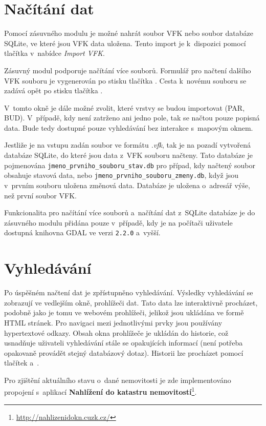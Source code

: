 \documentclass[a4paper,12pt,oneside]{book}
\begin{document}
\section{Načítání dat}
Pomocí zásuvného modulu je možné nahrát soubor VFK nebo soubor
databáze SQLite, ve které jsou VFK data uložena. Tento import je
k~dispozici pomocí tlačítka  v~nabídce \textit{Import
  VFK}.

Zásuvný modul podporuje načítání více souborů. Formulář pro načtení
dalšího VFK souboru je vygenerován po stisku tlačítka \uv{+}. Cesta
k~novému souboru se zadává opět po stisku tlačítka .

V~tomto okně je dále možné zvolit, které vrstvy se budou importovat
(PAR, BUD). V~případě, kdy není zatrženo ani jedno pole, tak se načtou
pouze popisná data. Bude tedy dostupné pouze vyhledávání bez interakce
s~mapovým oknem.

Jestliže je na vstupu zadán soubor ve formátu \textit{.vfk}, tak je na
pozadí vytvořená databáze SQLite, do které jsou data z~VFK souboru
načteny. Tato databáze je pojmenována
\texttt{jmeno\_prvniho\_souboru\_stav.db} pro případ, kdy načtený
soubor obsahuje stavová data, nebo
\texttt{jmeno\_prvniho\_souboru\_zmeny.db}, když jsou v~prvním souboru
uložena změnová data. Databáze je uložena o~adresář výše, než první
soubor VFK.

Funkcionalita pro načítání více souborů a~načítání dat z~SQLite
databáze je do zásuvného modulu přidána pouze v~případě, kdy je na
počítači uživatele dostupná knihovna GDAL ve verzi \texttt{2.2.0}
a~vyšší.

\section{Vyhledávání}
Po úspěšném načtení dat je zpřístupněno vyhledávání. Výsledky
vyhledávání se zobrazují ve vedlejším okně, prohlížeči dat. Tato data
lze interaktivně procházet, podobně jako je tomu ve webovém
prohlížeči, jelikož jsou ukládána ve formě HTML stránek. Pro navigaci
mezi jednotlivými prvky jsou používány hypertextové odkazy. Obsah okna
prohlížeče je ukládán do historie, což usnadňuje uživateli vyhledávání
stále se opakujících informací (není potřeba opakovaně provádět stejný
databázový dotaz). Historii lze procházet pomocí tlačítek 
a~.

Pro zjištění aktuálního stavu o~dané nemovitosti je zde implementováno
propojení s~aplikací \textbf{Nahlížení do katastru
  nemovitostí}\footnote{\url{http://nahlizenidokn.cuzk.cz/}}.
\end{document}
